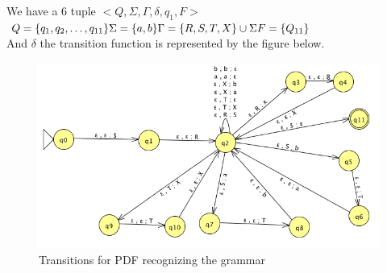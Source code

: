 \begin{problem}{3}
  \begin{solution}
    We have a 6 tuple $<Q, \Sigma, \Gamma, \delta, q_1, F>$ \\
    \(
      Q = \{ q_1, q_2, \ldots, q_{11} \} \\
      \Sigma = \{ a, b \} \\
      \Gamma = \{R, S, T, X \} \cup \Sigma \\
      F = \{ Q_{11} \}
    \) \\
    And $\delta$ the transition function is represented by the figure below.
    \begin{figure}[H]
      \centering
      \caption{Transitions for PDF recognizing the grammar}
      \includegraphics[scale=.6]{problem_3.png}
    \end{figure}
  \end{solution}
\end{problem}

